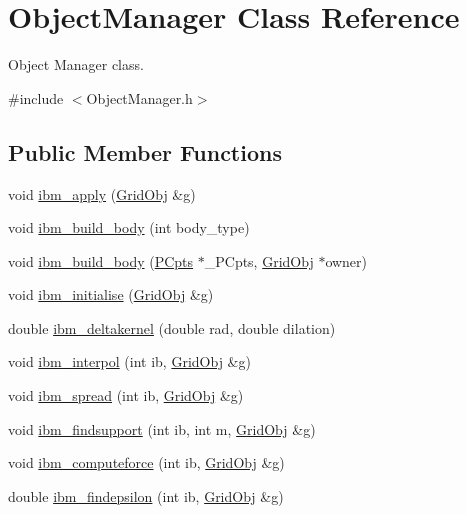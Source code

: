 \hypertarget{class_object_manager}{}\section{Object\+Manager Class Reference}
\label{class_object_manager}


Object Manager class.  




{\ttfamily \#include $<$Object\+Manager.\+h$>$}

\subsection*{Public Member Functions}
\begin{DoxyCompactItemize}
\item 
void \hyperlink{class_object_manager_a83174cbaabd95639f8b4f652ad398183}{ibm\+\_\+apply} (\hyperlink{class_grid_obj}{Grid\+Obj} \&g)
\item 
void \hyperlink{class_object_manager_af89336910b6f3157e5b17b4ea6d30a12}{ibm\+\_\+build\+\_\+body} (int body\+\_\+type)
\item 
void \hyperlink{class_object_manager_ac8270fe5b646e512a34748b5ca51671c}{ibm\+\_\+build\+\_\+body} (\hyperlink{class_p_cpts}{P\+Cpts} $\ast$\+\_\+\+P\+Cpts, \hyperlink{class_grid_obj}{Grid\+Obj} $\ast$owner)
\item 
void \hyperlink{class_object_manager_abc6dd6c73900724e7c0025d66e803c95}{ibm\+\_\+initialise} (\hyperlink{class_grid_obj}{Grid\+Obj} \&g)
\item 
double \hyperlink{class_object_manager_a4e55e3a84bae37a75f8487fd575169fb}{ibm\+\_\+deltakernel} (double rad, double dilation)
\item 
void \hyperlink{class_object_manager_a4df9f08d3a47519884afa17f1ecaa1da}{ibm\+\_\+interpol} (int ib, \hyperlink{class_grid_obj}{Grid\+Obj} \&g)
\item 
void \hyperlink{class_object_manager_a91d38ea7d0fbc6fd93e8c34559492b48}{ibm\+\_\+spread} (int ib, \hyperlink{class_grid_obj}{Grid\+Obj} \&g)
\item 
void \hyperlink{class_object_manager_a51772c72562eddaf91b1eabdf74eb4c9}{ibm\+\_\+findsupport} (int ib, int m, \hyperlink{class_grid_obj}{Grid\+Obj} \&g)
\item 
void \hyperlink{class_object_manager_ab1e4ac7c9e115b8e31e7a89ec32cbee0}{ibm\+\_\+computeforce} (int ib, \hyperlink{class_grid_obj}{Grid\+Obj} \&g)
\item 
double \hyperlink{class_object_manager_ab0ef3e60b3ea723d6989c6900107d5ef}{ibm\+\_\+findepsilon} (int ib, \hyperlink{class_grid_obj}{Grid\+Obj} \&g)

\end{DoxyCompactItemize}
